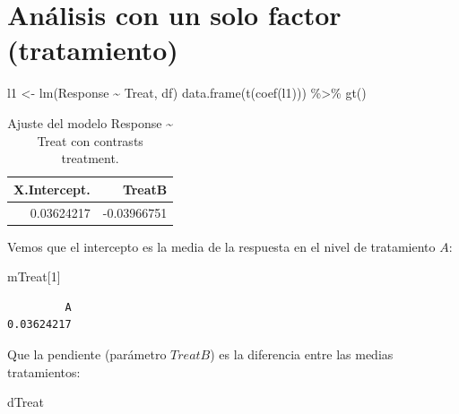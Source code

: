 \documentclass[
  12pt,
  a4paper,
  extrafontsizes,
  onecolumn,
  openright,
  table]{memoir}
\newenvironment{Shaded}{\begin{snugshade}}{\end{snugshade}}
\newcommand{\DecValTok}[1]{\textcolor[rgb]{0.68,0.00,0.00}{#1}}
\newcommand{\FunctionTok}[1]{\textcolor[rgb]{0.28,0.35,0.67}{#1}}
\newcommand{\NormalTok}[1]{\textcolor[rgb]{0.00,0.23,0.31}{#1}}
\newcommand{\OtherTok}[1]{\textcolor[rgb]{0.00,0.23,0.31}{#1}}
\newcommand{\SpecialCharTok}[1]{\textcolor[rgb]{0.37,0.37,0.37}{#1}}
\begin{document}
\normalsize

\hypertarget{anuxe1lisis-con-un-solo-factor-tratamiento}{%
\section{Análisis con un solo factor
(tratamiento)}\label{anuxe1lisis-con-un-solo-factor-tratamiento}}

\scriptsize

\begin{Shaded}
\begin{Highlighting}[]
\NormalTok{l1 }\OtherTok{\textless{}{-}} \FunctionTok{lm}\NormalTok{(Response }\SpecialCharTok{\textasciitilde{}}\NormalTok{ Treat, df)}
\FunctionTok{data.frame}\NormalTok{(}\FunctionTok{t}\NormalTok{(}\FunctionTok{coef}\NormalTok{(l1))) }\SpecialCharTok{\%\textgreater{}\%} \FunctionTok{gt}\NormalTok{()}
\end{Highlighting}
\end{Shaded}

\hypertarget{tbl-l1}{}
\begin{longtable}{rr}
\caption{\label{tbl-l1}Ajuste del modelo Response \textasciitilde{} Treat con contrasts
treatment. }\tabularnewline

\toprule
X.Intercept. & TreatB \\ 
\midrule
0.03624217 & -0.03966751 \\ 
\bottomrule
\end{longtable}

\normalsize

Vemos que el intercepto es la media de la respuesta en el nivel de
tratamiento \(A\):

\scriptsize

\begin{Shaded}
\begin{Highlighting}[]
\NormalTok{mTreat[}\DecValTok{1}\NormalTok{]}
\end{Highlighting}
\end{Shaded}

\begin{verbatim}
         A 
0.03624217 
\end{verbatim}

\normalsize

Que la pendiente (parámetro \(TreatB\)) es la diferencia entre las
medias tratamientos:

\scriptsize

\begin{Shaded}
\begin{Highlighting}[]
\NormalTok{dTreat}
\end{Highlighting}
\end{Shaded}
\end{document}
